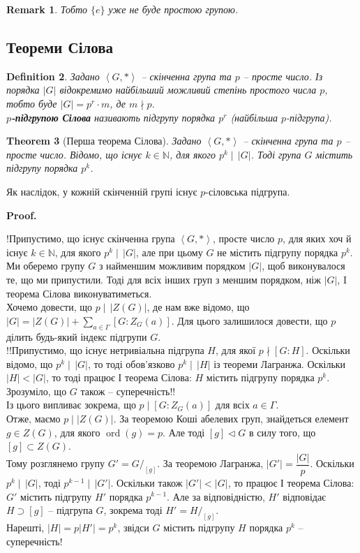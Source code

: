 \documentclass[a4paper, 10pt]{article}
\makeatletter
\theoremstyle{theoremdd}
\newtheorem{theorem}{Theorem}[subsection]
\theoremstyle{theoremdd}
\newtheorem{definition}[theorem]{Definition}
\theoremstyle{theoremdd}
\theoremstyle{theoremdd}
\theoremstyle{theoremdd}
\theoremstyle{theoremdd}
\theoremstyle{theoremdd}
\theoremstyle{theoremdd}
\theoremstyle{theoremdd}
\theoremstyle{theoremdd}
\theoremstyle{theoremdd}
\newtheorem{remark}[theorem]{Remark}
\theoremstyle{theoremdd}
\theoremstyle{theoremdd}
\theoremstyle{theoremdd}
\theoremstyle{theoremdd}
\renewenvironment{proof}[1][Proof.\\]{\par
\pushQED{\hfill \qed}%
\normalfont \topsep6\p@\@plus6\p@\relax
\trivlist
\item\relax
{\bfseries
#1\@addpunct{.}}\hspace\labelsep\ignorespaces
}{%
\popQED\endtrivlist\@endpefalse
}
\DeclareMathOperator{\ord}{ord}
\makeatother
\begin{document}
\begin{remark}
Тобто $\{e\}$ уже не буде простою групою.
\end{remark}

\subsection{Теореми Сілова}
\begin{definition}
Задано $\left< G, * \right>$ -- скінченна група та $p$ -- просте число. Із порядка $|G|$ відокремимо найбільший можливий степінь простого числа $p$, тобто буде $|G| = p^r \cdot m$, де $m \nmid p$.\\
\textbf{$p$-підгрупою Сілова} називають підгрупу порядка $p^r$ (найбільша $p$-підгрупа).
\end{definition}

\begin{theorem}[Перша теорема Сілова]
Задано $\left< G, * \right>$ -- скінченна група та $p$ -- просте число. Відомо, що існує $k \in \mathbb{N}$, для якого $p^k \mid \, |G|$. Тоді група $G$ містить підгрупу порядка $p^k$.
\end{theorem}

Як наслідок, у кожній скінченній групі існує $p$-сіловська підгрупа.

\begin{proof}
!Припустимо, що існує скінченна група $\left< G, *\right>$, просте число $p$, для яких хоч й існує $k \in \mathbb{N}$, для якого $p^k \mid \, |G|$, але при цьому $G$ не містить підгрупу порядка $p^k$.\\
Ми оберемо групу $G$ з найменшим можливим порядком $|G|$, щоб виконувалося те, що ми припустили. Тоді для всіх інших груп з меншим порядком, ніж $|G|$, I теорема Сілова виконуватиметься.\\
Хочемо довести, що $p \mid \, |Z(G)|$, де нам вже відомо, що $|G| = |Z(G)| + \displaystyle\sum_{a \in \Gamma} [G:Z_G(a)]$. Для цього залишилося довести, що $p$ ділить будь-який індекс підгрупи $G$.\\
!!Припустимо, що існує нетривіальна підгрупа $H$, для якої $p \nmid [G:H]$. Оскільки відомо, що $p^k \mid \, |G|$, то тоді обов'язково $p^k \mid \, |H|$ із теореми Лагранжа. Оскільки $|H| < |G|$, то тоді працює І теорема Сілова: $H$ містить підгрупу порядка $p^k$. Зрозуміло, що $G$ також -- суперечність!!\\
Із цього випливає зокрема, що $p \mid [G:Z_G(a)]$ для всіх $a \in \Gamma$.\\
Отже, маємо $p \mid |Z(G)|$. За теоремою Коші абелевих груп, знайдеться елемент $g \in Z(G)$, для якого $\ord(g) = p$. Але тоді $[g] \triangleleft G$ в силу того, що $[g] \subset Z(G)$.\\
Тому розглянемо групу $G' = G/_{[g]}$. За теоремою Лагранжа, $|G'| = \dfrac{|G|}{p}$. Оскільки $p^k \mid \, |G|$, тоді $p^{k-1} \mid \, |G'|$. Оскільки також $|G'| < |G|$, то працює І теорема Сілова: $G'$ містить підгрупу $H'$ порядка $p^{k-1}$. Але за відповідністю, $H'$ відповідає $H \supset [g]$ -- підгрупа $G$, зокрема тоді $H' = H/_{[g]}$.\\
Нарешті, $|H| = p |H'| = p^k$, звідси $G$ містить підгрупу $H$ порядка $p^k$ -- суперечність!
\end{proof}
\end{document}
